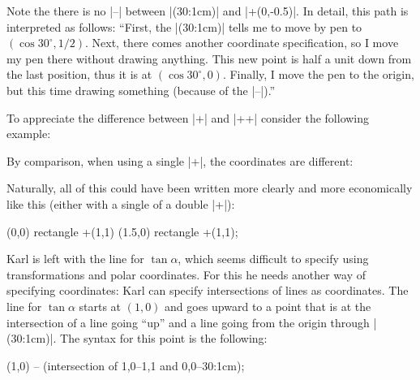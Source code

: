 Note the there is no |--| between |(30:1cm)| and |+(0,-0.5)|. In
detail, this path is interpreted as follows: ``First, the |(30:1cm)|
tells me to move by pen to $(\cos 30^\circ,1/2)$. Next, there comes
another coordinate specification, so I move my pen there without drawing
anything. This new point is half a unit down from the last position,
thus it is at $(\cos 30^\circ,0)$. Finally, I move the pen to the
origin, but this time drawing something (because of the |--|).''

To appreciate the difference between |+| and |++| consider the
following example:

\begin{codeexample}[]
\end{codeexample}

By comparison, when using a single |+|, the coordinates are different:

\begin{codeexample}[]
\end{codeexample}


Naturally, all of this could have been written more clearly and more
economically like this (either with a single of a double |+|): 
\begin{codeexample}[]
\tikz \draw (0,0) rectangle +(1,1)  (1.5,0) rectangle +(1,1);
\end{codeexample}



Karl is left with the line for $\tan \alpha$, which seems difficult to
specify using transformations and polar coordinates. For this he needs
another way of specifying coordinates: Karl can specify intersections
of lines as coordinates. The line for $\tan \alpha$ starts at $(1,0)$
and goes upward to a point that is at the intersection of a line going
``up'' and a line going from the origin through |(30:1cm)|. The syntax
for this point is the following:

\begin{codeexample}
 (1,0) -- (intersection of 1,0--1,1 and 0,0--30:1cm);
\end{codeexample}

